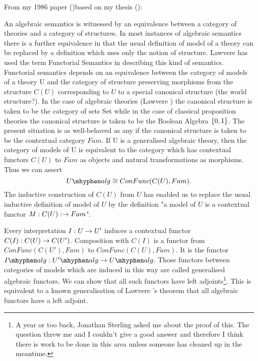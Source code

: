 \note From my 1986 paper (\cite{Cartmell86})based on my thesis (\cite{Cartmell78}):
\begin{tightquote}
An algebraic semantics is witnessed by an equivalence between a category of
theories and a category of structures. In most instances of algebraic semantics
there is a further equivalence in that the usual definition of model of a theory can
be replaced by a definition which uses only the notion of structure. Lawvere has
used the term Functorial Semantics in describing this kind of semantics.
Functorial semantics depends on an equivalence between the category of models
of a theory U and the category of structure preserving morphisms from the
structure $C(U)$ corresponding to $U$ to a special canonical structure (the world
structure?). In the case of algebraic theories (Lawvere \cite{LawvereAlgebraicTheories}) the canonical structure
is taken to be the category of sets Set while in the case of classical proposition
theories the canonical structure is taken to be the Boolean Algebra $\left\{0, 1\right\}$.
The present situation is as well-behaved as any if the canonical structure is
taken to be the contextual category $Fam$.
If U is a generalised algebraic theory, then the category of models of U is
equivalent to the category which has contextual functors $C(U)$ to $Fam$ as objects
and natural transformations as morphisms. Thus we can assert
\begin{equation*}
\Ualg \cong ConFunc(C(U), Fam).
\end{equation*}
The inductive construction of $C(U)$ from $U$ has enabled us to replace the usual 
inductive definition of model of $U$ by the definition "a model of $U$ is a contextual
functor $M: C(U): \rightarrow Fam$".

Every interpretation $I:U \rightarrow U'$ induces a contextual functor 
$C(I):C(U) \rightarrow C(U')$. Composition with $C(I)$ is a functor from 
$ConFunc(C(U'),Fam)$ to
$ConFunc(C(U),Fam)$. It is the functor $\Ialg:\Upalg \morph \Ualg$. Those functors
between categories of models which are induced in this way are called generalised
algebraic functors. We can show that all such functors have left adjoints\footnote{A year or too back, Jonathan Sterling asked me about the proof of this. The question threw me and I couldn't give a good answer and therefore I think there is work to be done in this area unless someone has cleaned up in the meantime.}.
This is
equivalent to a known generalisation of Lawvere \cite{LawvereAlgebraicTheories}'s theorem that all algebraic
functors have a left adjoint. 
\end{tightquote}



